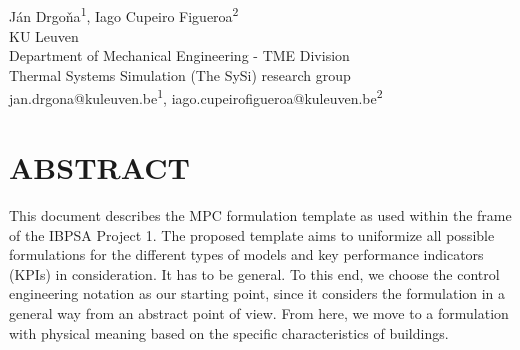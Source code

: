 \documentclass[10pt]{extarticle}
\begin{document}
	
\begin{center}
\vspace{0.2in}
\\[14pt]

{\fontsize{11pt}{1.2em}\selectfont
 J\'an Drgo\v na\textsuperscript{1}, Iago Cupeiro Figueroa\textsuperscript{2}
\\[11pt]

KU Leuven\\
Department of Mechanical Engineering - TME Division\\
Thermal Systems Simulation  (The SySi) research group  \\[11pt]

jan.drgona@kuleuven.be\textsuperscript{1},
iago.cupeirofigueroa@kuleuven.be\textsuperscript{2} \\
}
\end{center}

\vspace{0.5cm}


\section*{ABSTRACT}

This document describes the MPC formulation template as used within the frame of the IBPSA Project 1.
The proposed template aims to uniformize all possible formulations for the different types of models and key performance indicators (KPIs) in consideration.
It has to be general.
To this end, we choose the control engineering notation as our starting point,
since it considers the formulation in a general way from an abstract point of view.
From here, we move to a formulation with physical meaning based on the specific characteristics of buildings.

%
%	
\end{document}
